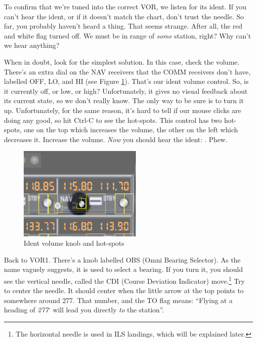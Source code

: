 To confirm that we're tuned into the correct VOR, we listen for its
ident.  If you can't hear the ident, or if it doesn't match the chart,
don't trust the needle.  So far, you probably haven't heard a thing.
That seems strange.  After all, the red and white flag turned off.  We
must be in range of \emph{some} station, right?  Why can't we hear
anything?

When in doubt, look for the simplest solution.  In this case, check
the volume.  There's an extra dial on the NAV receivers that the COMM
receivers don't have, labelled OFF, LO, and HI (see Figure
\ref{fig:ident}).  That's our ident volume control.  So, is it
currently off, or low, or high?  Unfortunately, it gives no visual
feedback about its current state, so we don't really know.  The only
way to be sure is to turn it up.  Unfortunately, for the same reason,
it's hard to tell if our mouse clicks are doing any good, so hit
Ctrl-C to see the hot-spots.  This control has two hot-spots, one on
the top which increases the volume, the other on the left which
decreases it.  Increase the volume.  \emph{Now} you should hear the
ident: \mdot\mdot\mdot\mspace \mdot\mdash\mdash\mdash\mspace
\mdash\mdot\mdash\mdot.  Phew.


\begin{figure}
  \begin{center}
    \includegraphics[width=6cm]{img/ident_knob.png}
    \caption{Ident volume knob and hot-spots}
    \label{fig:ident}
  \end{center}
\end{figure}

Back to VOR1.  There's a knob labelled OBS (Omni Bearing Selector).
As the name vaguely suggests, it is used to select a bearing.  If you
turn it, you should see the vertical needle, called the CDI (Course
Deviation Indicator) move.\footnote{The horizontal needle is used in
  ILS landings, which will be explained later.}  Try to center the
needle.  It should center when the little arrow at the top points to
somewhere around 277.  That number, and the TO flag means: ``Flying at
a heading of \emph{277$^\circ$} will lead you directly \emph{to} the
station''.

